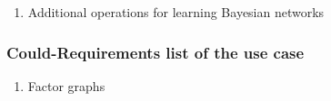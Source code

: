 \begin{enumerate}
\item Additional operations for learning Bayesian networks
\end{enumerate}

\subsubsection*{Could-Requirements list of the use case}

\begin{enumerate}
\item Factor graphs
\end{enumerate}